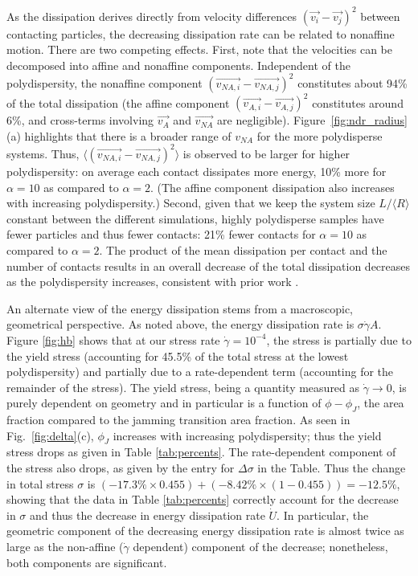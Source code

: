 \documentclass[%
 reprint,
 amsmath,amssymb,
 aps,
]{revtex4-2}
\begin{document}
As the dissipation derives directly from velocity differences $(\vec{v_i}-\vec{v_j})^2$ between contacting particles, the decreasing dissipation rate can be related to nonaffine motion.  There are two competing effects.  First, note that the velocities can be decomposed into affine and nonaffine components.  Independent of the polydispersity, the nonaffine component $(\vec{v_{NA,i}}-\vec{v_{NA,j}})^2$ constitutes about 94\% of the total dissipation (the affine component $(\vec{v_{A,i}}-\vec{v_{A,j}})^2$ constitutes around 6\%, and cross-terms involving $\vec{v_A}$ and $\vec{v_{NA}}$ are negligible).  Figure~\ref{fig:ndr_radius}(a) highlights that there is a broader range of $v_{NA}$ for the more polydisperse systems. Thus, $\langle (\vec{v_{NA,i}}-\vec{v_{NA,j}})^2 \rangle$ is observed to be larger for higher polydispersity:  on average each contact dissipates more energy, 10\% more for $\alpha=10$ as compared to $\alpha=2$.  (The affine component dissipation also increases with increasing polydispersity.)  Second, given that we keep the system size $L/\langle R \rangle$ constant between the different simulations, highly polydisperse samples have fewer particles and thus fewer contacts:  21\% fewer contacts for $\alpha=10$ as compared to $\alpha=2$.  The product of the mean dissipation per contact and the number of contacts results in an overall decrease of the total dissipation decreases as the polydispersity increases, consistent with prior work \cite{pednekar18}.

An alternate view of the energy dissipation stems from a macroscopic, geometrical perspective.  As noted above, the energy dissipation rate is $\sigma \dot{\gamma} A$.  Figure \ref{fig:hb} shows that at our stress rate $\dot{\gamma} =10^{-4}$, the stress is partially due to the yield stress (accounting for 45.5\% of the total stress at the lowest polydispersity) and partially due to a rate-dependent term (accounting for the remainder of the stress).  The yield stress, being a quantity measured as $\dot{\gamma} \rightarrow 0$, is purely dependent on geometry and in particular is a function of $\phi-\phi_J$, the area fraction compared to the jamming transition area fraction. As seen in Fig.~\ref{fig:delta}(c), $\phi_J$ increases with increasing polydispersity; thus the yield stress drops as given in Table \ref{tab:percents}.  The rate-dependent component of the stress also drops, as given by the entry for $\Delta \sigma$ in the Table.  Thus the change in total stress $\sigma$ is $(-17.3\% \times 0.455) + (-8.42\% \times (1-0.455)) = -12.5\%$, showing that the data in Table \ref{tab:percents} correctly account for the decrease in $\sigma$ and thus the decrease in energy dissipation rate $\dot{U}$.  In particular, the geometric component of the decreasing energy dissipation rate is almost twice as large as the non-affine ($\dot\gamma$ dependent) component of the decrease; nonetheless, both components are significant.
\end{document}
